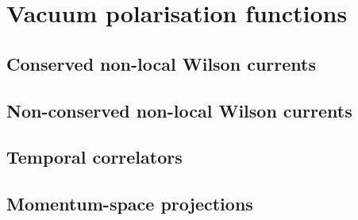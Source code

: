 \section{Vacuum polarisation functions}

\subsection{Conserved non-local Wilson currents}

\subsection{Non-conserved non-local Wilson currents}

\subsection{Temporal correlators}

\subsection{Momentum-space projections}
